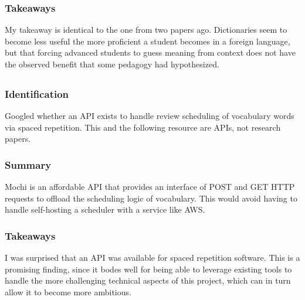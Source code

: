 \documentclass[
	letterpaper, %
]{jdf}
\begin{document}
\subsubsection{Takeaways}
My takeaway is identical to the one from two papers ago. Dictionaries seem to become less useful the more proficient a student becomes in a foreign language, but that forcing advanced students to guess meaning from context does not have the observed benefit that some pedagogy had hypothesized.

\subsection{}
\subsubsection{Identification}
Googled whether an API exists to handle review scheduling of vocabulary words via spaced repetition. This and the following resource are APIs, not research papers.

\subsubsection{Summary}
Mochi is an affordable API that provides an interface of POST and GET HTTP requests to offload the scheduling logic of vocabulary. This would avoid having to handle self-hosting a scheduler with a service like AWS.

\subsubsection{Takeaways}
I was surprised that an API was available for spaced repetition software. This is a promising finding, since it bodes well for being able to leverage existing tools to handle the more challenging technical aspects of this project, which can in turn allow it to become more ambitious.

\subsection{}
\end{document}
